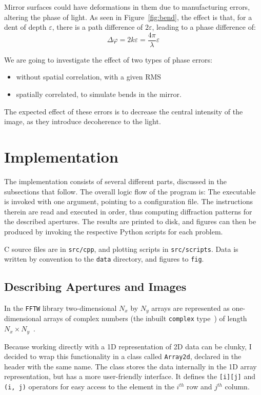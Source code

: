 \documentclass{article}
\newcommand{\eps}{\varepsilon}
\newcommand{\ph}{\varphi}
\newcommand{\CC}{{C\nolinebreak[4]\hspace{-.05em}\raisebox{.3ex}{\scriptsize\bf ++}}}
\begin{document}
Mirror surfaces could have deformations in them due to manufacturing errors, altering the phase of light. As seen in Figure~\ref{fig:bend}, the effect is that, for a dent of depth $\eps$, there is a path difference of $2\eps$, leading to a phase difference of:
\begin{equation}
    \Delta\ph = 2k\eps = \frac{4\pi}{\lambda}\eps
\end{equation}

We are going to investigate the effect of two types of phase errors:
\begin{itemize}
    \item without spatial correlation, with a given RMS
    \item spatially correlated, to simulate bends in the mirror.
\end{itemize}

The expected effect of these errors is to decrease the central intensity of the image, as they introduce decoherence to the light.

\section{Implementation}\label{sec:impl}
The implementation consists of several different parts, discussed in the subsections that follow. The overall logic flow of the program is:
The executable is invoked with one argument, pointing to a configuration file. The instructions therein are read and executed in order, thus computing diffraction patterns for the described apertures. The results are printed to disk, and figures can then be produced by invoking the respective Python scripts for each problem.

\CC{} source files are in \texttt{src/cpp}, and plotting scripts in \texttt{src/scripts}. Data is written by convention to the \texttt{data} directory, and figures to \texttt{fig}.

\subsection{Describing Apertures and Images}
In the \texttt{FFTW} library two-dimensional $N_x$ by $N_y$ arrays are represented as one-dimensional arrays of complex numbers (the inbuilt \texttt{complex} type~\cite{cppcomplex}) of length $N_x \times N_y$~\cite[Section 3.2]{fftw}.

Because working directly with a 1D representation of 2D data can be clunky, I decided to wrap this functionality in a class called \texttt{Array2d}, declared in the header with the same name. The class stores the data internally in the 1D array representation, but has a more user-friendly interface. It defines the \texttt{[i][j]} and \texttt{(i, j)} operators for easy access to the element in the $i^{th}$ row and $j^{th}$ column.
\end{document}

